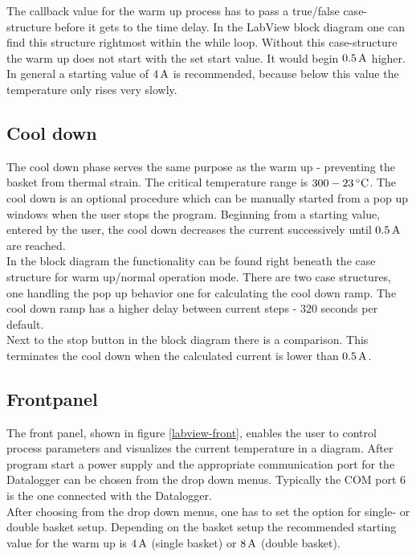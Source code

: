 \documentclass[parskip,12pt,headsepline,a4paper] {scrbook}
\begin{document}
The callback value for the warm up process has to pass a true/false case-structure before it gets to the time delay. In the LabView block diagram one can find this structure rightmost within the while loop. Without this case-structure the warm up does not start with the set start value. It would begin $\unit[0.5]{A}$ higher. In general a starting value of $\unit[4]{A}$ is recommended, because below this value the temperature only rises very slowly.

\subsection{Cool down}
\vspace{-1\baselineskip}
The cool down phase serves the same purpose as the warm up - preventing the basket from thermal strain. The critical temperature range is $\unit[300 - 23]{^\circ C}$. The cool down is an optional procedure which can be manually started from a pop up windows when the user stops the program. Beginning from a starting value, entered by the user, the cool down decreases the current successively until $\unit[0.5]{A}$ are reached. \\
In the block diagram the functionality can be found right beneath the case structure for warm up/normal operation mode. There are two case structures, one handling the pop up behavior one for calculating the cool down ramp. The cool down ramp has a higher delay between current steps - $320$ seconds per default. \\
Next to the stop button in the block diagram there is a comparison. This terminates the cool down when the calculated current is lower than $\unit[0.5]{A}$.

\subsection{Frontpanel}
\vspace{-1\baselineskip}
The front panel, shown in figure \ref{labview-front}, enables the user to control process parameters and visualizes the current temperature in a diagram. After program start a power supply and the appropriate communication port for the Datalogger can be chosen from the drop down menus. Typically the COM port 6 is the one connected with the Datalogger. \\
After choosing from the drop down menus, one has to set the option for single- or double basket setup. Depending on the basket setup the recommended starting value for the warm up is $\unit[4]{A}$ (single basket) or $\unit[8]{A}$ (double basket).
\end{document}
